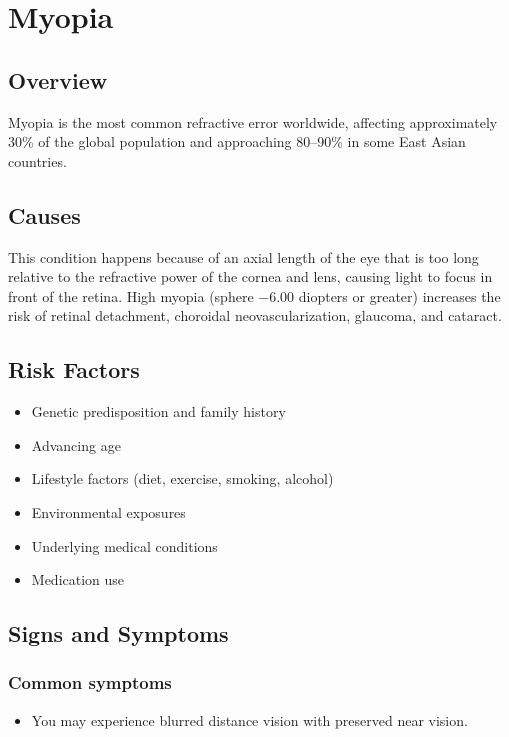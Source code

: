 \chapter{Myopia}
\label{sec:Myopia}

\section{Overview}
Myopia is the most common refractive error worldwide, affecting approximately 30\% of the global population and approaching 80--90\% in some East Asian countries.
\section{Causes}
This condition happens because of an axial length of the eye that is too long relative to the refractive power of the cornea and lens, causing light to focus in front of the retina. High myopia (sphere $-6.00$ diopters or greater) increases the risk of retinal detachment, choroidal neovascularization, glaucoma, and cataract.     
\section{Risk Factors}

\begin{itemize}[noitemsep]
  \item Genetic predisposition and family history
  \item Advancing age
  \item Lifestyle factors (diet, exercise, smoking, alcohol)
  \item Environmental exposures
  \item Underlying medical conditions
  \item Medication use
\end{itemize}
\section{Signs and Symptoms}

\subsection{Common symptoms}
\begin{itemize}[noitemsep]
  \item You may experience blurred distance vision with preserved near vision. 
  \end{itemize}

